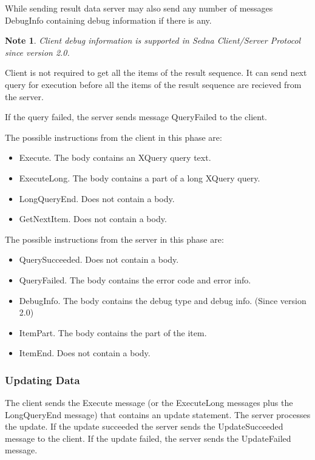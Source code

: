 \documentclass[a4paper,12pt]{article}
\newtheorem{note}{Note}
\begin{document}
While sending result data server may also send any number of messages DebugInfo containing debug information if there is any.

\begin{note}
Client debug information is supported in Sedna Client/Server Protocol since version 2.0.
\end{note}

Client is not required to get all the items of the result sequence. It can send next query for execution before all the items of the result sequence are recieved from the server.

If the query failed, the server sends message QueryFailed to the client.

The possible instructions from the client in this phase are:
\begin{itemize} 
\item Execute. The body contains an XQuery query text.
\item ExecuteLong. The body contains a part of a long XQuery query.
\item LongQueryEnd. Does not contain a body.
\item GetNextItem. Does not contain a body.
\end{itemize}

The possible instructions from the server in this phase are:
\begin{itemize} 
\item QuerySucceeded. Does not contain a body.
\item QueryFailed. The body contains the error code and error info.
\item DebugInfo. The body contains the debug type and debug info. (Since version 2.0)
\item ItemPart. The body contains the part of the item.
\item ItemEnd. Does not contain a body.
\end{itemize}

\subsubsection{Updating Data}

The client sends the Execute message (or the ExecuteLong messages plus the LongQueryEnd message) that contains an update statement. The server processes the update. If the update succeeded the server sends the UpdateSucceeded message to the client. If the update failed, the server sends the UpdateFailed message.
\end{document}
